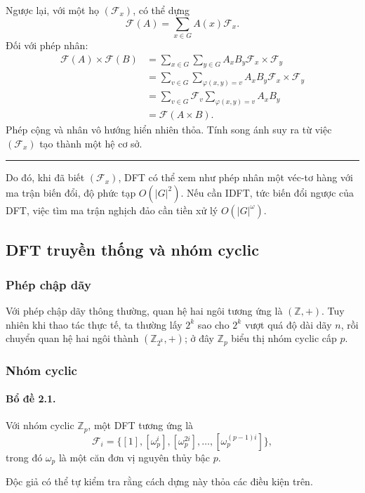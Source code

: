 \documentclass[11pt]{article}
\begin{document}
Ngược lại, với một họ $(\mathcal F_x)$, có thể dựng
\[
  \mathcal F(A)=\sum_{x\in G} A(x)\mathcal F_x.
\]
Đối với phép nhân:
\[
\begin{aligned}
\mathcal F(A)\times\mathcal F(B)
&=\sum_{x\in G}\sum_{y\in G} A_xB_y\mathcal F_x\times\mathcal F_y\\
&=\sum_{v\in G}\sum_{\varphi(x,y)=v} A_xB_y\mathcal F_x\times\mathcal F_y\\
&=\sum_{v\in G}\mathcal F_v\sum_{\varphi(x,y)=v} A_xB_y\\
&=\mathcal F(A\times B).
\end{aligned}
\]
Phép cộng và nhân vô hướng hiển nhiên thỏa. Tính song ánh suy ra từ việc
$(\mathcal F_x)$ tạo thành một hệ cơ sở. \hfill\rule{0.55em}{0.55em}

Do đó, khi đã biết $(\mathcal F_x)$, DFT có thể xem như phép nhân một véc-tơ
hàng với ma trận biến đổi, độ phức tạp $O(|G|^2)$. Nếu cần IDFT, tức biến đổi
ngược của DFT, việc tìm ma trận nghịch đảo cần tiền xử lý $O(|G|^\omega)$.

\subsection{DFT truyền thống và nhóm cyclic}

\subsubsection{Phép chập dãy}

Với phép chập dãy thông thường, quan hệ hai ngôi tương ứng là $(\mathbb Z,+)$.
Tuy nhiên khi thao tác thực tế, ta thường lấy $2^k$ sao cho $2^k$ vượt quá độ
dài dãy $n$, rồi chuyển quan hệ hai ngôi thành $(\mathbb Z_{2^k},+)$; ở đây
$\mathbb Z_p$ biểu thị nhóm cyclic cấp $p$.

\subsubsection{Nhóm cyclic}

\paragraph{Bổ đề 2.1.}
Với nhóm cyclic $\mathbb Z_p$, một DFT tương ứng là
\[
  \mathcal F_i=\{[1],[\omega_p^i],[\omega_p^{2i}],\ldots,
  [\omega_p^{(p-1)i}]\},
\]
trong đó $\omega_p$ là một căn đơn vị nguyên thủy bậc $p$.

Độc giả có thể tự kiểm tra rằng cách dựng này thỏa các điều kiện trên.
\end{document}
